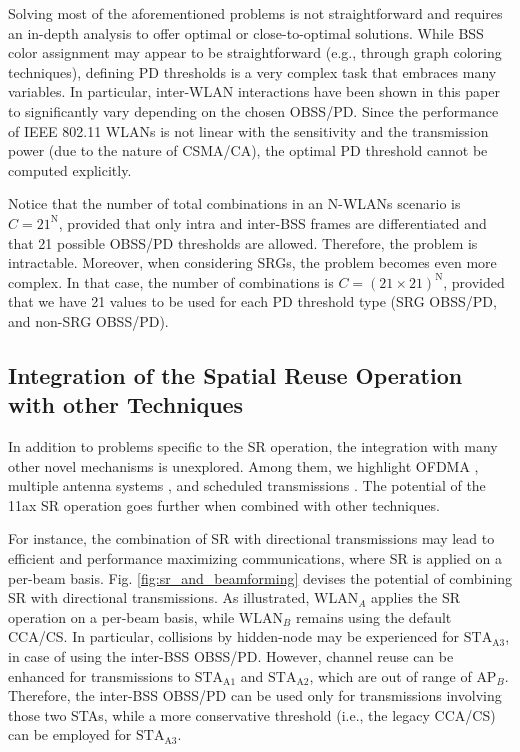 \documentclass[comsoc]{IEEEtran}
\begin{document}
	Solving most of the aforementioned problems is not straightforward and requires an in-depth analysis to offer optimal or close-to-optimal solutions. While BSS color assignment may appear to be straightforward (e.g., through graph coloring techniques), defining PD thresholds is a very complex task that embraces many variables. In particular, inter-WLAN interactions have been shown in this paper to significantly vary depending on the chosen OBSS/PD. Since the performance of IEEE 802.11 WLANs is not linear with the sensitivity and the transmission power (due to the nature of CSMA/CA), the optimal PD threshold cannot be computed explicitly. 
	
	Notice that the number of total combinations in an N-WLANs scenario is $C = 21^\text{N}$, provided that only intra and inter-BSS frames are differentiated and that 21 possible OBSS/PD thresholds are allowed. Therefore, the problem is intractable. Moreover, when considering SRGs, the problem becomes even more complex. In that case, the number of combinations is $C = (21\times21)^\text{N}$, provided that we have 21 values to be used for each PD threshold type (SRG OBSS/PD, and non-SRG OBSS/PD).
	
	\subsection{Integration of the Spatial Reuse Operation with other Techniques}
	
	In addition to problems specific to the SR operation, the integration with many other novel mechanisms is unexplored. Among them, we highlight OFDMA \cite{bankov2018ofdma, dovelos2018optimal}, multiple antenna systems \cite{liao2016mu}, and scheduled transmissions \cite{nurchis2019target}. The potential of the 11ax SR operation goes further when combined with other techniques. 
	
	For instance, the combination of SR with directional transmissions may lead to efficient and performance maximizing communications, where SR is applied on a per-beam basis. Fig. \ref{fig:sr_and_beamforming} devises the potential of combining SR with directional transmissions. As illustrated, $\text{WLAN}_A$ applies the SR operation on a per-beam basis, while $\text{WLAN}_B$ remains using the default CCA/CS. In particular, collisions by hidden-node may be experienced for $\text{STA}_\text{A3}$, in case of using the inter-BSS OBSS/PD. However, channel reuse can be enhanced for transmissions to $\text{STA}_\text{A1}$ and $\text{STA}_\text{A2}$, which are out of range of $\text{AP}_B$. Therefore, the inter-BSS OBSS/PD can be used only for transmissions involving those two STAs, while a more conservative threshold (i.e., the legacy CCA/CS) can be employed for $\text{STA}_\text{A3}$.
	
\end{document}
